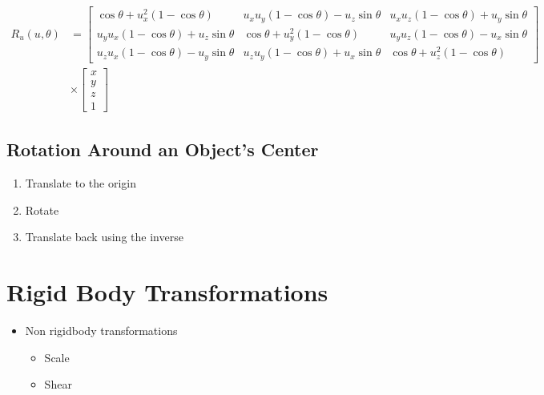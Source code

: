   \begin{align*}
    R_{u}\left( u, \theta \right) &=
    \begin{bmatrix}
      \cos\theta + u_{x}^{2}\left( 1 - \cos\theta \right)
      & u_{x} u_{y} \left( 1 - \cos\theta \right) - u_{z} \sin\theta
      & u_{x} u_{z} \left( 1 - \cos\theta \right) + u_{y} \sin\theta \\
      u_{y} u_{x} \left( 1 - \cos\theta \right) + u_{z} \sin\theta
      & \cos\theta + u_{y}^{2}\left( 1 - \cos\theta \right)
      & u_{y} u_{z} \left( 1 - \cos\theta \right) - u_{x} \sin\theta \\
      u_{z} u_{x} \left( 1 - \cos\theta \right) - u_{y} \sin\theta
      & u_{z} u_{y} \left( 1 - \cos\theta \right) + u_{x} \sin\theta
      & \cos\theta + u_{z}^{2}\left( 1 - \cos\theta \right)
    \end{bmatrix} \\
    &\times
    \begin{bmatrix}
      x \\
      y \\
      z \\
      1
    \end{bmatrix}
  \end{align*}

  \subsection{Rotation Around an Object's Center}

    \begin{enumerate}
      \item Translate to the origin
      \item Rotate
      \item Translate back using the inverse
    \end{enumerate}

\section{Rigid Body Transformations}

  \begin{itemize}
    \item Non rigidbody transformations
    \begin{itemize}
      \item Scale
      \item Shear
    \end{itemize}
  \end{itemize}

